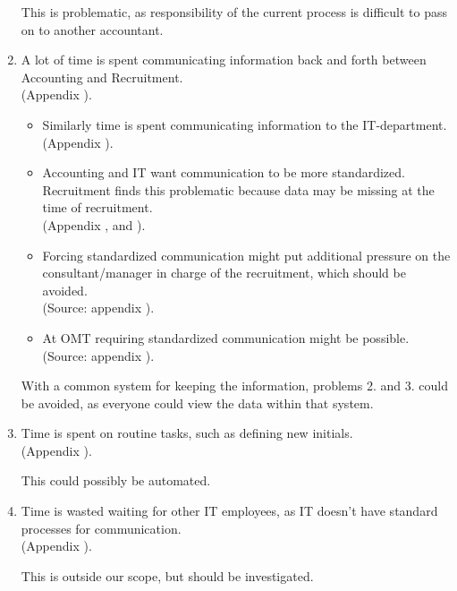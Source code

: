 \begin{enumerate}
This is problematic, as responsibility of the current process is difficult to pass on to another accountant.

\item A lot of time is spent communicating information back and forth between Accounting and Recruitment. \\
(Appendix ).
\begin{itemize}
\item Similarly time is spent communicating information to the IT-department.\\
(Appendix ).
\item Accounting and IT want communication to be more standardized. Recruitment finds this problematic because data may be missing at the time of recruitment.\\
(Appendix ,  and ).
\item Forcing standardized communication might put additional pressure on the consultant/manager in charge of the recruitment, which should be avoided.\\
(Source: appendix ).
\item At OMT requiring standardized communication might be possible.\\
(Source: appendix ).
\end{itemize}

With a common system for keeping the information, problems 2. and 3. could be avoided, as everyone could view the data within that system.

\item Time is spent on routine tasks, such as defining new initials.\\
(Appendix ).

This could possibly be automated.

\item Time is wasted waiting for other IT employees, as IT doesn't have standard processes for communication.\\
(Appendix ).

This is outside our scope, but should be investigated.
\end{enumerate}

